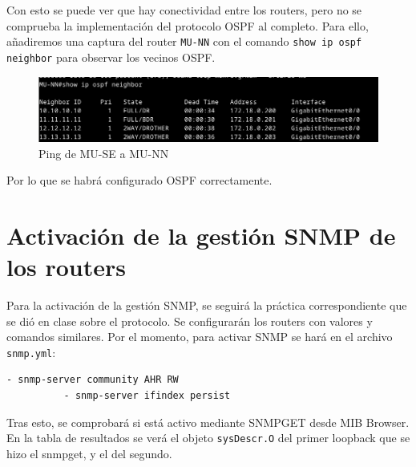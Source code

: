 \documentclass[11pt]{article}
\begin{document}
Con esto se puede ver que hay conectividad entre los routers, pero no se comprueba la implementación del protocolo OSPF al completo. Para ello, añadiremos una captura del router \texttt{MU-NN} con el comando \texttt{show ip ospf neighbor} para observar los vecinos OSPF.


\begin{figure}[h]
    \centering
    \includegraphics[width=\textwidth]{src/neighbors.png}
    \caption{Ping de MU-SE a MU-NN }
\end{figure}

Por lo que se habrá configurado OSPF correctamente.

\section{Activación de la gestión SNMP de los routers}

Para la activación de la gestión SNMP, se seguirá la práctica correspondiente que se dió en clase sobre el protocolo. Se configurarán los routers con valores y comandos similares. Por el momento, para activar SNMP se hará en el archivo \texttt{snmp.yml}:

\begin{tcolorbox}[
    boxrule=0pt,
    title=Configuración de OSPF en MU-NN, 
]
    \begin{lstlisting}[gobble=6]
          - snmp-server community AHR RW
          - snmp-server ifindex persist
    \end{lstlisting}
\end{tcolorbox}

Tras esto, se comprobará si está activo mediante SNMPGET desde MIB Browser. En la tabla de resultados se verá el objeto \texttt{sysDescr.O} del primer loopback que se hizo el snmpget, y el del segundo.
\end{document}
